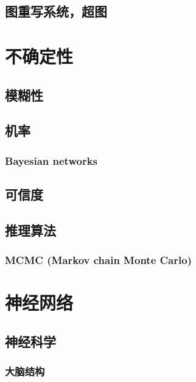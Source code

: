 \documentclass[12pt, a4paper]{report}
\newcommand{\cc}[2]{#1}
\newcommand{\cc}[2]{#2}
\theoremstyle{examples} \newtheorem{example}{Example}[section]
\begin{document}
	\section{\cc{图重写系统，超图}{Graph rewriting systems, hypergraphs}}

\chapter{\cc{不确定性}{Uncertainty}}

	\section{\cc{模糊性}{Fuzziness}}

	\section{\cc{机率}{Probability}}
	
		\subsection{Bayesian networks}

	\section{\cc{可信度}{Confidence}}

	\section{\cc{推理算法}{Uncertain inference}}
	
		\subsection{MCMC (Markov chain Monte Carlo)}

\chapter{\cc{神经网络}{Neural networks}}

	\section{\cc{神经科学}{Neuroscience}}
	
		\subsection{\cc{大脑结构}{Brain architecture}}
\end{document}
